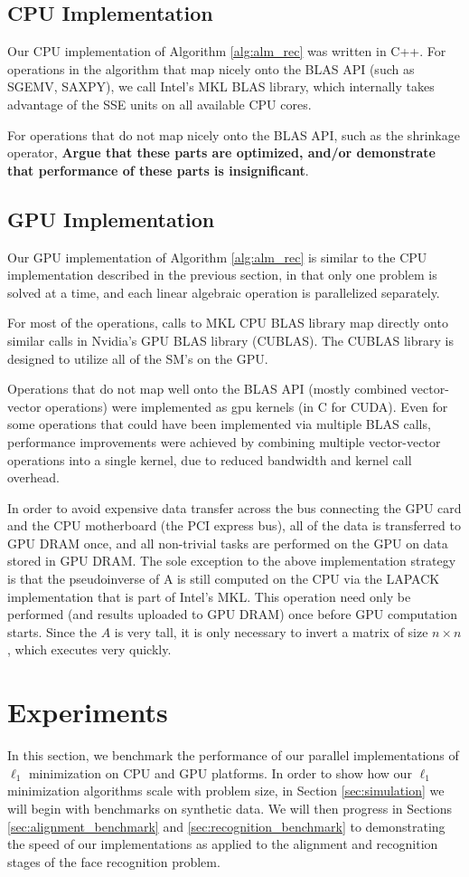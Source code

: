 \documentclass[10pt,twocolumn,letterpaper]{article}
\begin{document}
\subsection{CPU Implementation} Our CPU implementation of Algorithm
\ref{alg:alm_rec} was written in C++.  For operations in the algorithm that map
nicely onto the BLAS API (such as SGEMV, SAXPY), we
call Intel's MKL BLAS library, which internally takes advantage of the SSE
units on all available CPU cores. 

For operations that do not map nicely onto the BLAS API, such as the shrinkage
operator, {\bf Argue that these parts are optimized, and/or demonstrate that
performance of these parts is insignificant}.

\subsection{GPU Implementation} Our GPU implementation of Algorithm
\ref{alg:alm_rec} is similar to the CPU implementation described in the
previous section, in that only one problem is solved at a time, and each linear
algebraic operation is parallelized separately.

For most of the operations, calls to MKL CPU BLAS library map directly onto
similar calls in Nvidia's GPU BLAS library (CUBLAS).  The CUBLAS library is
designed to utilize all of the SM's on the GPU.  

Operations that do not map well onto the BLAS API (mostly combined
vector-vector operations) were implemented as gpu kernels (in C for CUDA).
Even for some operations that could have been implemented via multiple BLAS
calls, performance improvements were achieved by combining multiple
vector-vector operations into a single kernel, due to reduced bandwidth and
kernel call overhead.  

In order to avoid expensive data transfer across the bus connecting the GPU
card and the CPU motherboard (the PCI express bus), all of the data is
transferred to GPU DRAM once, and all non-trivial tasks are performed on the
GPU on data stored in GPU DRAM.  The sole exception to the above implementation
strategy is that the pseudoinverse of A is still computed on the CPU via the
LAPACK implementation that is part of Intel's MKL. This operation need only be
performed (and results uploaded to GPU DRAM) once before GPU computation
starts. Since the $A$ is very tall, it is only necessary to invert a matrix
of size $n \times n$, which executes very quickly.

\section{Experiments}
\label{sec:experiment}
In this section, we benchmark the performance of our parallel implementations
of $\ell_1$ minimization on CPU and GPU platforms.  In order to show how our
$\ell_1$ minimization algorithms scale with problem size, in Section
\ref{sec:simulation} we will begin with benchmarks on synthetic data.  We will
then progress in Sections \ref{sec:alignment_benchmark} and
\ref{sec:recognition_benchmark} to demonstrating the speed of our
implementations as applied to the alignment and recognition stages of the face
recognition problem.
\end{document}
